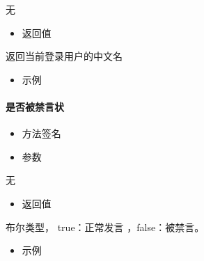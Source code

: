 \documentclass[letterpaper,10pt,english]{sphinxmanual}
\begin{document}
无
\begin{itemize}
\item {} 
返回值

\end{itemize}

返回当前登录用户的中文名
\begin{itemize}
\item {} 
示例

\end{itemize}

%
\begin{sphinxVerbatim}[commandchars=\\\{\}]
   
   
\end{sphinxVerbatim}


\paragraph{是否被禁言状}
\label{\detokenize{csharp:id18}}\begin{itemize}
\item {} 
方法签名

\end{itemize}

%
\begin{sphinxVerbatim}[commandchars=\\\{\}]
  
\end{sphinxVerbatim}
\begin{itemize}
\item {} 
参数

\end{itemize}

无
\begin{itemize}
\item {} 
返回值

\end{itemize}

布尔类型， true：正常发言 ，false：被禁言。
\begin{itemize}
\item {} 
示例

\end{itemize}
\end{document}
